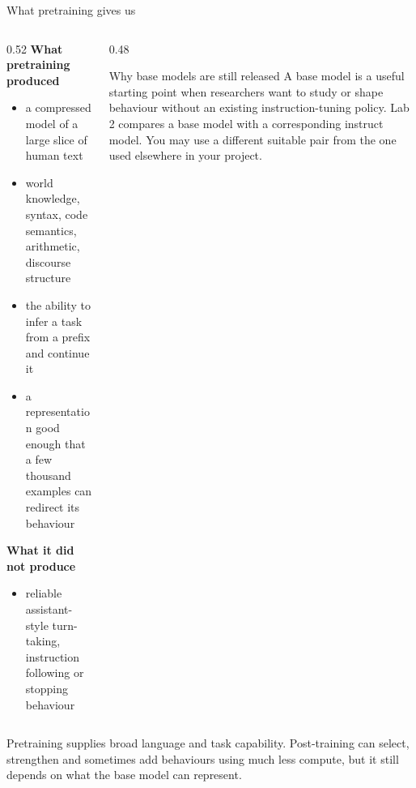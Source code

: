 \documentclass[aspectratio=169,10pt]{beamer}
\begin{document}
\begin{frame}[shrink=11]{What pretraining gives us}
  \begin{columns}[T]
    \begin{column}{0.52\textwidth}
      \textbf{What pretraining produced}
      \begin{itemize}\small
        \item a compressed model of a large slice of human text
        \item world knowledge, syntax, code semantics, arithmetic, discourse
          structure
        \item the ability to infer a task from a prefix and continue it
        \item a representation good enough that a few thousand examples can
          redirect its behaviour
      \end{itemize}
      \vspace{0.5em}
      \textbf{What it did not produce}
      \begin{itemize}\small
        \item reliable assistant-style turn-taking, instruction following or
          stopping behaviour
      \end{itemize}
    \end{column}
    \begin{column}{0.48\textwidth}
      \begin{block}{Why base models are still released}
        \small
        A base model is a useful starting point when researchers want to study
        or shape behaviour without an existing instruction-tuning policy.
        \vspace{0.4em}
        Lab 2 compares a base model with a corresponding instruct model. You
        may use a different suitable pair from the one used elsewhere in your
        project.
      \end{block}
    \end{column}
  \end{columns}
  \vfill
  \begin{takeaway}
    Pretraining supplies broad language and task capability. Post-training can
    select, strengthen and sometimes add behaviours using much less compute,
    but it still depends on what the base model can represent.
  \end{takeaway}
\end{frame}
\end{document}
